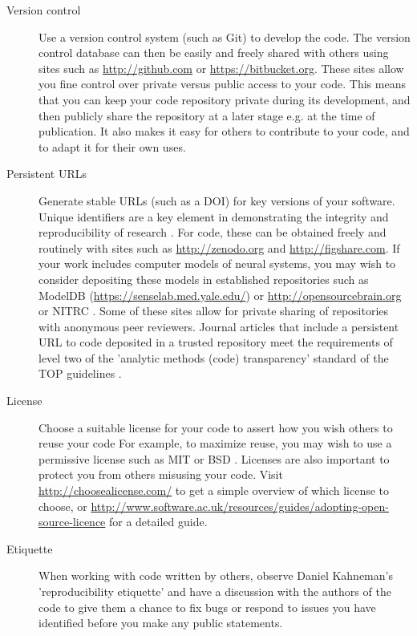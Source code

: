 \documentclass[11pt]{article}
\begin{document}
\begin{description}
\item [Version control] Use a version control system (such as Git) to
  develop the code.  The version control database can then be easily
  and freely shared with others using sites such as
  \url{http://github.com} \cite{Ram2013} or
  \url{https://bitbucket.org}.  These sites allow you fine control
  over private versus public access to your code.  This means that you
  can keep your code repository private during its development, and
  then publicly share the repository at a later stage e.g. at the time
  of publication. It also makes it easy for others to contribute to your code, and to adapt it for their own uses. 

\item [Persistent URLs] Generate stable URLs (such as a DOI) for key
  versions of your software.  Unique identifiers are a key element in demonstrating the integrity and reproducibility of research \cite{vasilevsky2013reproducibility}. For code, these can be obtained freely and routinely with sites such as \url{http://zenodo.org} and \url{http://figshare.com}.  If your work includes computer models of neural systems, you may wish to consider depositing these models in established repositories such as ModelDB (\url{https://senselab.med.yale.edu/}) or \url{http://opensourcebrain.org} or NITRC \cite{poline_software_2014}. Some of these sites allow for private sharing of repositories with anonymous peer reviewers. Journal articles that include a persistent URL to code deposited in a trusted repository meet the requirements of level two of the 'analytic methods (code) transparency' standard of the TOP guidelines \cite{Nosek2015}.


\item [License] Choose a suitable license for your code to assert how
  you wish others to reuse your code  For example, to maximize reuse,
  you may wish to use a permissive license such as MIT or BSD
  \cite{Stodden2009}.  Licenses are also important to protect you from
  others misusing your code.  Visit \url{http://choosealicense.com/}
  to get a simple overview of which license to choose, or 
  \url{http://www.software.ac.uk/resources/guides/adopting-open-source-licence}
  for a detailed guide.

\item [Etiquette] When working with code written by others, observe Daniel Kahneman's  'reproducibility etiquette'\cite{Kahneman2014} and have a discussion with the authors of the code to give them a chance to fix bugs or respond to issues you have identified before you make any public statements. 


\end{description}
\end{document}
